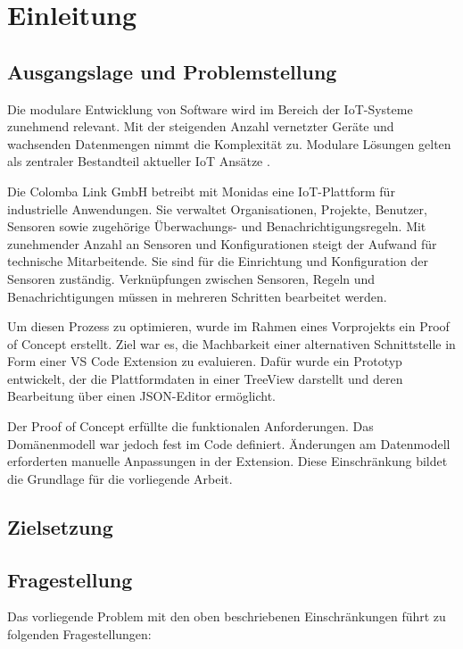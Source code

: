 \section{Einleitung}

\subsection{Ausgangslage und Problemstellung}
Die modulare Entwicklung von Software wird im Bereich der IoT-Systeme zunehmend relevant. Mit der steigenden Anzahl vernetzter Geräte und wachsenden Datenmengen nimmt die Komplexität zu. Modulare Lösungen gelten als zentraler Bestandteil aktueller IoT Ansätze \cite{IoT}.

Die Colomba Link GmbH betreibt mit Monidas eine IoT-Plattform für industrielle Anwendungen. Sie verwaltet Organisationen, Projekte, Benutzer, Sensoren sowie zugehörige Überwachungs- und Benachrichtigungsregeln. Mit zunehmender Anzahl an Sensoren und Konfigurationen steigt der Aufwand für technische Mitarbeitende. Sie sind für die Einrichtung und Konfiguration der Sensoren zuständig. Verknüpfungen zwischen Sensoren, Regeln und Benachrichtigungen müssen in mehreren Schritten bearbeitet werden.

Um diesen Prozess zu optimieren, wurde im Rahmen eines Vorprojekts ein Proof of Concept erstellt. Ziel war es, die Machbarkeit einer alternativen Schnittstelle in Form einer VS Code Extension zu evaluieren. Dafür wurde ein Prototyp entwickelt, der die Plattformdaten in einer TreeView darstellt und deren Bearbeitung über einen JSON-Editor ermöglicht.
 
Der Proof of Concept erfüllte die funktionalen Anforderungen. Das Domänenmodell war jedoch fest im Code definiert. Änderungen am Datenmodell erforderten manuelle Anpassungen in der Extension. Diese Einschränkung bildet die Grundlage für die vorliegende Arbeit.

\subsection{Zielsetzung}



\subsection{Fragestellung}
Das vorliegende Problem mit den oben beschriebenen Einschränkungen führt zu folgenden Fragestellungen:

